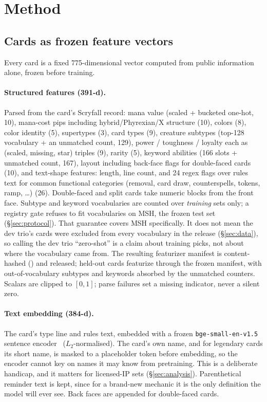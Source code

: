 \section{Method}
\label{sec:method}

\subsection{Cards as frozen feature vectors}
\label{sec:features}

Every card is a fixed 775-dimensional vector computed from public
information alone, frozen before training.

\paragraph{Structured features (391-d).}
Parsed from the card's Scryfall record: mana value (scaled + bucketed
one-hot, 10), mana-cost pips including hybrid/Phyrexian/X structure (10),
colors (8), color identity (5), supertypes (3), card types (9), creature
subtypes (top-128 vocabulary + an unmatched count, 129), power / toughness
/ loyalty each as (scaled, missing, star) triples (9), rarity (5), keyword
abilities (166 slots + unmatched count, 167), layout including back-face
flags for double-faced cards (10), and text-shape features: length, line
count, and 24 regex flags over rules text for common functional categories
(removal, card draw, counterspells, tokens, ramp, \ldots) (26).
Double-faced and split cards take numeric blocks from the front face.
Subtype and keyword vocabularies are counted over \emph{training} sets
only; a registry gate refuses to fit vocabularies on MSH, the frozen test
set (\S\ref{sec:protocol}). That guarantee covers MSH specifically. It does
not mean the dev trio's cards were excluded from every vocabulary in the
release (\S\ref{sec:data}), so calling the dev trio ``zero-shot'' is a
claim about training picks, not about where the vocabulary came from. The
resulting featurizer manifest is content-hashed
(\texttt{\FeaturizerHash}) and released; held-out cards featurize through
the frozen manifest, with out-of-vocabulary subtypes and keywords absorbed
by the unmatched counters. Scalars are clipped to $[0,1]$; parse failures
set a missing indicator, never a silent zero.

\paragraph{Text embedding (384-d).}
The card's type line and rules text, embedded with a frozen
\texttt{bge-small-en-v1.5} sentence encoder~\citep{xiao2023bge}
($L_2$-normalised). The card's own name, and for legendary cards its
short name, is masked to a placeholder token before embedding, so the
encoder cannot key on names it may know from pretraining. This is a
deliberate handicap, and it matters for licensed-IP sets
(\S\ref{sec:analysis}). Parenthetical reminder text is kept, since for a
brand-new mechanic it is the only definition the model will ever see. Back faces are appended for
double-faced cards.

